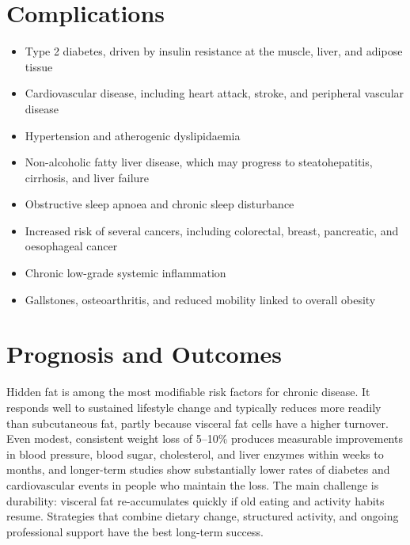 \section*{Complications}
\begin{itemize}
    \item Type 2 diabetes, driven by insulin resistance at the muscle, liver, and adipose tissue
    \item Cardiovascular disease, including heart attack, stroke, and peripheral vascular disease
    \item Hypertension and atherogenic dyslipidaemia
    \item Non-alcoholic fatty liver disease, which may progress to steatohepatitis, cirrhosis, and liver failure
    \item Obstructive sleep apnoea and chronic sleep disturbance
    \item Increased risk of several cancers, including colorectal, breast, pancreatic, and oesophageal cancer
    \item Chronic low-grade systemic inflammation
    \item Gallstones, osteoarthritis, and reduced mobility linked to overall obesity
\end{itemize}

\section*{Prognosis and Outcomes}
Hidden fat is among the most modifiable risk factors for chronic disease. It responds well to sustained lifestyle change and typically reduces more readily than subcutaneous fat, partly because visceral fat cells have a higher turnover. Even modest, consistent weight loss of 5--10\% produces measurable improvements in blood pressure, blood sugar, cholesterol, and liver enzymes within weeks to months, and longer-term studies show substantially lower rates of diabetes and cardiovascular events in people who maintain the loss. The main challenge is durability: visceral fat re-accumulates quickly if old eating and activity habits resume. Strategies that combine dietary change, structured activity, and ongoing professional support have the best long-term success.

